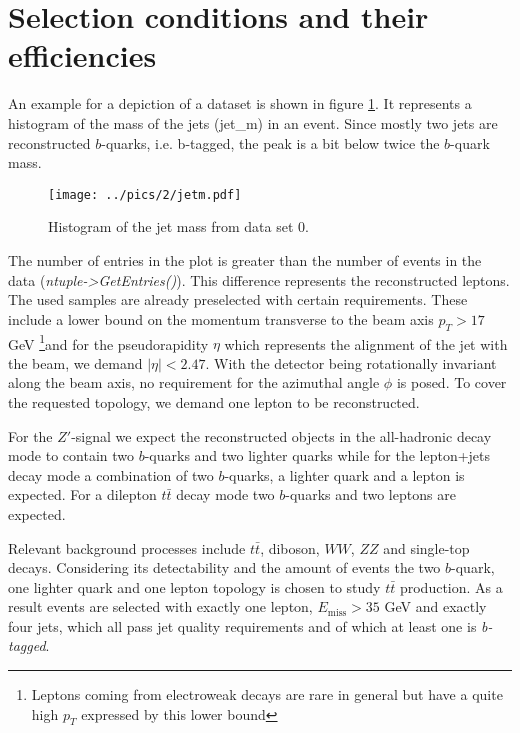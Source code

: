 \FloatBarrier
\section{Selection conditions and their efficiencies}
An example for a depiction of a dataset is shown in figure \ref{pic:examplePlot}. It represents a histogram of the mass of the jets (jet\_m) in an
event. Since mostly two jets are reconstructed $b$-quarks, i.e. b-tagged, the peak is a bit below twice the $b$-quark mass. 
\begin{figure}[t]
 \texttt{[image: ../pics/2/jetm.pdf]}
 \caption{Histogram of the jet mass from data set 0.}
 \label{pic:examplePlot}
\end{figure}
The number of entries in the plot is greater than the number of events in the data (\emph{ntuple->GetEntries()}). This difference represents the reconstructed leptons.
The used samples are already preselected with certain requirements. These include a lower bound on the momentum transverse to the beam axis $p_T>17$ GeV 
\footnote[1]{Leptons coming from electroweak
decays are rare in general but have a quite high $p_T$ expressed by this lower bound}and
for the pseudorapidity $\eta$ which represents the alignment of the jet with the beam, we demand $|\eta| < 2.47$. With the detector being rotationally
invariant along the beam axis, no requirement for the azimuthal angle $\phi$ is posed. To cover the requested topology, we demand one lepton to be reconstructed. 

For the $Z'$-signal we expect the reconstructed objects in the all-hadronic decay mode to contain two $b$-quarks and two lighter quarks while for the lepton+jets decay mode a combination of two $b$-quarks, a lighter quark and a lepton is expected. For a dilepton $t\bar{t}$ decay mode two $b$-quarks and two leptons are expected.

Relevant background processes include $t\bar{t}$, diboson, $WW$, $ZZ$ and single-top decays. Considering its detectability and the amount of events the two $b$-quark, one lighter quark and one lepton topology is chosen to study $t\bar{t}$ production. As a result events are selected with exactly one lepton, $E_\text{miss} > 35$ GeV and exactly four jets, which all pass jet quality requirements and of which at least one is \emph{b-tagged}.

